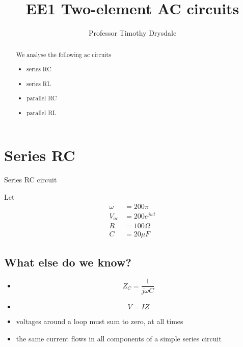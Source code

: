 \documentclass{tufte-handout}
\title{EE1 Two-element AC circuits}
\author{Professor Timothy Drysdale}
\newcommand{\vac}{V_{ac}}%
\begin{document}
\maketitle


\begin{abstract}
\noindent
We analyse the following ac circuits
\begin{itemize}
\item series RC
\item series RL
\item parallel RC
\item parallel RL
\end{itemize}
\end{abstract}

\section{Series RC}

\begin{marginfigure}

\caption{Series RC circuit}
\label{fig:seriesRC}
\end{marginfigure}

Let 
\begin{align}
\omega &= 200\pi \\
\vac & = 200e^{jwt}\\
R &= 100\Omega \\
C &= 20\mu F 
\end{align}

\subsection{What else do we know? }
\begin{itemize}
\item \[Z_C = \frac{1}{j\omega C}\]
\item \[ V = IZ \]
\item voltages around a loop must sum to zero, at all times
\item the same current flows in all components of a simple series circuit

\end{itemize}
\end{document}

